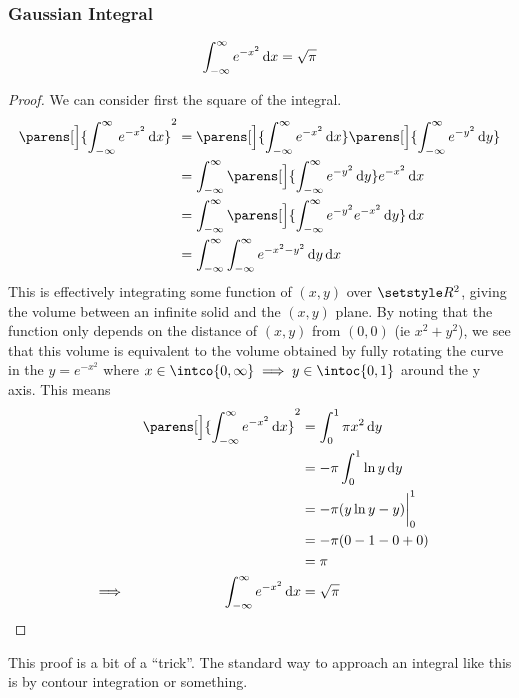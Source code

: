 \subsubsection{Gaussian Integral}

\begin{theorem} \label{thm_gauss_integral}
 \begin{equation*}
  \integ[-\infty]<\infty>{e^{-x^2}}{x} = \sqrt \pi
 \end{equation*}
\end{theorem}
\begin{proof}
 We can consider first the square of the integral.
 \begin{align*}
  \parens[\Big]{\integ[-\infty]<\infty>{e^{-x^2}}{x}}^2
  &= \parens[\Big]{\integ[-\infty]<\infty>{e^{-x^2}}{x}}
     \parens[\Big]{\integ[-\infty]<\infty>{e^{-y^2}}{y}} \\
  &= \integ[-\infty]<\infty>{
                 \parens[\Big]{\integ[-\infty]<\infty>{e^{-y^2}}{y}}
             e^{-x^2}}{x} \\
  &= \integ[-\infty]<\infty>{
         \parens[\Big]{\integ[-\infty]<\infty>{e^{-y^2} e^{-x^2}}{y}}}{x} \\
  &= \integ[-\infty]<\infty>{
         \integ[-\infty]<\infty>{e^{-x^2-y^2}}{y}}{x}
 \end{align*}
 This is effectively integrating some function of \((x, y)\) over
 \(\Reals^2\), giving the volume between an infinite solid and the \((x, y)\)
 plane. By noting that the function only depends on the distance of
 \((x, y)\) from \((0, 0)\) (ie \(x^2 + y^2\)), we see that this volume is
 equivalent to the volume obtained by fully rotating the curve in the
 \(y = e^{-x^2}\) where
 \(x \in \intco{0, \infty} \implies y \in \intoc{0, 1}\) around the y axis.
 This means
 \begin{alignat*}{2}
  && \parens[\Big]{\integ[-\infty]<\infty>{e^{-x^2}}{x}}^2
      &= \integ[0]<1>{\pi x^2}{y} \\
  &&  &= -\pi \integ[0]<1>{\ln y}{y} \\
  &&  &= -\pi (y\ln y - y)\eval_0^1 \\
  &&  &= -\pi (0 - 1 - 0 + 0) \\
  &&  &= \pi \\
  &\implies{}& \integ[-\infty]<\infty>{e^{-x^2}}{x}
      &= \sqrt \pi \qedhere
 \end{alignat*}
\end{proof}
This proof is a bit of a ``trick''. The standard way to approach an integral
like this is by contour integration or something.

